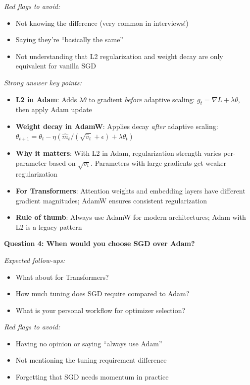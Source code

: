 \documentclass[../../main.tex]{subfiles}
\begin{document}
\begin{interviewquestions}
\textit{Red flags to avoid:}
\begin{itemize}
    \item Not knowing the difference (very common in interviews!)
    \item Saying they're ``basically the same''
    \item Not understanding that L2 regularization and weight decay are only equivalent for vanilla SGD
\end{itemize}

\textit{Strong answer key points:}
\begin{itemize}
    \item \textbf{L2 in Adam}: Adds $\lambda\theta$ to gradient \textit{before} adaptive scaling: $g_t = \nabla L + \lambda\theta$, then apply Adam update
    \item \textbf{Weight decay in AdamW}: Applies decay \textit{after} adaptive scaling: $\theta_{t+1} = \theta_t - \eta(\hat{m}_t/(\sqrt{\hat{v}_t}+\epsilon) + \lambda\theta_t)$
    \item \textbf{Why it matters}: With L2 in Adam, regularization strength varies per-parameter based on $\sqrt{v_t}$. Parameters with large gradients get weaker regularization
    \item \textbf{For Transformers}: Attention weights and embedding layers have different gradient magnitudes; AdamW ensures consistent regularization
    \item \textbf{Rule of thumb}: Always use AdamW for modern architectures; Adam with L2 is a legacy pattern
\end{itemize}

\vspace{0.5em}
\textbf{Question 4: When would you choose SGD over Adam?}

\textit{Expected follow-ups:}
\begin{itemize}
    \item What about for Transformers?
    \item How much tuning does SGD require compared to Adam?
    \item What is your personal workflow for optimizer selection?
\end{itemize}

\textit{Red flags to avoid:}
\begin{itemize}
    \item Having no opinion or saying ``always use Adam''
    \item Not mentioning the tuning requirement difference
    \item Forgetting that SGD needs momentum in practice
\end{itemize}


\end{interviewquestions}
\end{document}
